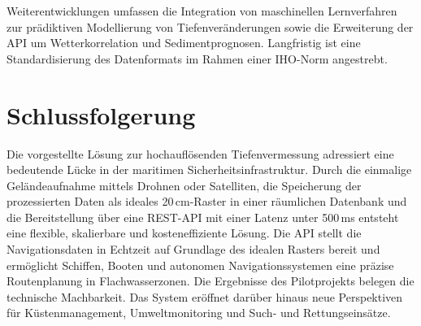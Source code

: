 ﻿\documentclass[a4paper,12pt]{article}
\theoremstyle{definition}
\begin{document}
Weiterentwicklungen umfassen die Integration von maschinellen Lernverfahren zur
prädikti\-ven Modellierung von Tiefenveränderungen sowie die Erweiterung der API um
Wetterkorrelation und Sedimentprognosen. Langfristig ist eine Standardisierung des
Datenformats im Rahmen einer IHO-Norm angestrebt.

\section{Schlussfolgerung}

Die vorgestellte Lösung zur hochauflösenden Tiefenvermessung adressiert eine bedeutende
Lücke in der maritimen Sicherheitsinfrastruktur. Durch die einmalige Geländeaufnahme
mittels Drohnen oder Satelliten, die Speicherung der prozessierten Daten als ideales
20\,cm-Raster in einer räumlichen Datenbank und die Bereitstellung über eine REST-API
mit einer Latenz unter 500\,ms entsteht eine flexible, skalierbare und kosteneffiziente
Lösung. Die API stellt die Navigationsdaten in Echtzeit auf Grundlage des idealen Rasters
bereit und ermöglicht Schiffen, Booten und autonomen Navigations\-systemen eine
präzise Routenplanung in Flachwasserzonen. Die Ergebnisse des Pilotprojekts belegen
die technische Machbarkeit. Das System eröffnet darüber hinaus neue Perspektiven für
Küstenmanagement, Umweltmonitoring und Such- und Rettungseinsätze.

\end{document}
